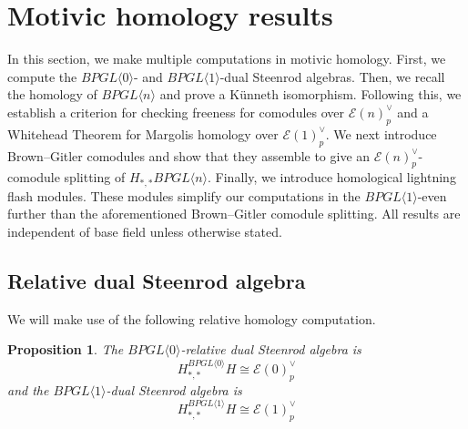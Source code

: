 \documentclass{amsart}
\newtheorem{proposition}[theorem]{Proposition}
\theoremstyle{plain}
\numberwithin{theorem}{section}
\numberwithin{equation}{section}
\numberwithin{figure}{section}
\newcommand{\cE}{{\mathcal E}}
\newcommand{\0}{\langle 0 \rangle }
\begin{document}
\section{Motivic homology results}
\label{sec:motivic homology}

In this section, we make multiple computations in motivic homology. First, we compute the $BPGL\langle 0 \rangle$- and $BPGL \langle 1 \rangle$-dual Steenrod algebras. Then, we recall the homology of $BPGL \langle n \rangle$ and prove a K\"unneth isomorphism. Following this, we establish a criterion for checking freeness for comodules over $\mathcal{E}(n)_p^\vee$ and a Whitehead Theorem for Margolis homology over $\mathcal{E}(1)^\vee_p$. We next introduce Brown--Gitler comodules and show that they assemble to give an $\mathcal{E}(n)^\vee_p$-comodule splitting of $H_{*,*}BPGL \langle n \rangle$. Finally, we introduce homological lightning flash modules. These modules simplify our computations in the $BPGL \langle 1 \rangle$-even further than the aforementioned Brown--Gitler comodule splitting. All results are independent of base field unless otherwise stated.
\subsection{Relative dual Steenrod algebra}
We will make use of the following relative homology computation.

\begin{proposition} \label{prop:relHomology}
    The $BPGL \langle 0 \rangle$-relative dual Steenrod algebra is
    \[
    H_{*,*}^{BPGL \langle 0 \rangle} H \cong \cE(0)_p^\vee
    \]
    and the $BPGL \langle 1 \rangle$-dual Steenrod algebra is
    \[
    H_{*,*}^{BPGL \langle 1 \rangle} H \cong \cE(1)_p^\vee
    \]
\end{proposition}

\end{document}
